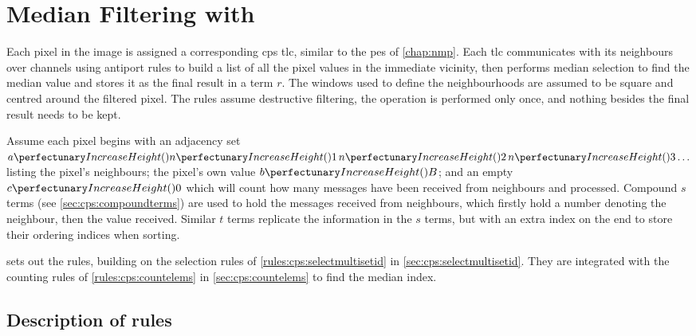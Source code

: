 \section{Median Filtering with }\label{sec:medianfilter}

Each pixel in the image is assigned a corresponding \gls{cps} \gls{tlc}, similar to the \glspl{pe} of \cref{chap:nmp}.  Each \gls{tlc} communicates with its neighbours over channels using antiport rules to build a list of all the pixel values in the immediate vicinity, then performs median selection to find the median value and stores it as the final result in a term \(r\).  The windows used to define the neighbourhoods are assumed to be square and centred around the filtered pixel. The rules assume destructive filtering, \ie{} the operation is performed only once, and nothing besides the final result needs to be kept.

Assume each pixel begins with an adjacency set \(\cpfunc{a}{\cpfunc{n}{1} \, \cpfunc{n}{2} \, \cpfunc{n}{3} \ldots}\) listing the pixel's neighbours; the pixel's own value \(\cpfunc{b}{B}\); and an empty \(\cpfunc{c}{0}\) which will count how many messages have been received from neighbours and processed.   Compound \(s\) terms (see \vref{sec:cps:compoundterms}) are used to hold the messages received from neighbours, which firstly hold a number denoting the neighbour, then the value received. Similar \(t\) terms replicate the information in the \(s\) terms, but with an extra index on the end to store their ordering indices when sorting.

 sets out the rules, building on the selection rules of \vref{rules:cps:selectmultisetid} in \cref{sec:cps:selectmultisetid}.  They are integrated with the counting rules of \vref{rules:cps:countelems} in \cref{sec:cps:countelems} to find the median index.

\subsection{Description of rules}

